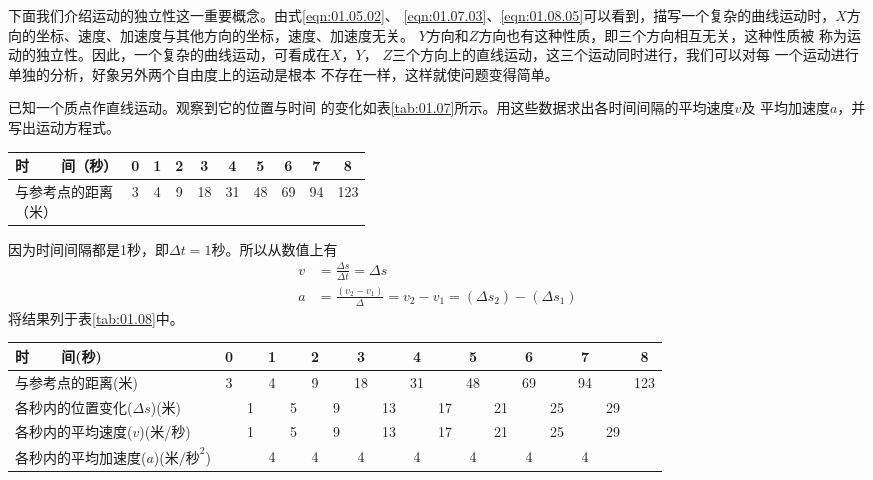 下面我们介绍运动的独立性这一重要概念。由式\eqref{eqn:01.05.02}、
\eqref{eqn:01.07.03}、\eqref{eqn:01.08.05}可以看到，描写一个复杂的曲线运动时，$X$方
向的坐标、速度、加速度与其他方向的坐标，速度、加速度无关。
$Y$方向和$Z$方向也有这种性质，即三个方向相互无关，这种性质被
称为运动的独立性。因此，一个复杂的曲线运动，可看成在$X$，$Y$，
$Z$三个方向上的直线运动，这三个运动同时进行，我们可以对每
一个运动进行单独的分析，好象另外两个自由度上的运动是根本
不存在一样，这样就使问题变得简单。

\example 已知一个质点作直线运动。观察到它的位置与时间
的变化如表\ref{tab:01.07}所示。用这些数据求出各时间间隔的平均速度$v$及
平均加速度$a$，并写出运动方程式。
\begin{tablex}[!h]{0.6em}
    \caption{}
    \label{tab:01.07}
    \centering
    \begin{tabular}{l|c|c|c|c|c|c|c|c|c}
        \toprule
        时~~~~间（秒） & 0 & 1 & 2 & 3 & 4 & 5 & 6 & 7 & 8 \\
        \midrule
        \makecell{与参考点的距离                           \\（米）}  &  3  &  4  &  9  &  18  &  31  &  48  &  69  &  94 & 123 \\
        \bottomrule
    \end{tabular}
\end{tablex}

\solution 因为时间间隔都是1秒，即$\Delta t=1$秒。所以从数值上有
\begin{align*}
    v & =\frac{\Delta s}{\Delta t}=\Delta s                         \\
    a & =\frac{(v_2-v_1)}{\Delta}=v_2-v_1=(\Delta s_2)-(\Delta s_1)
\end{align*}
将结果列于表\ref{tab:01.08}中。
\begin{tablex}[!h]{0.2mm}
        \caption{}
        \label{tab:01.08}
        \centering {}
        \begin{tabular}{l|c|c|c|c|c|c|c|c|c|c|c|c|c|c|c|c|c}
            \toprule
            时~~~~间(秒)                              & 0 &   & 1 &   & 2 &   & 3  &    & 4  &    & 5  &    & 6  &    & 7  &    & 8   \\
            \midrule
            与参考点的距离(米)                        & 3 &   & 4 &   & 9 &   & 18 &    & 31 &    & 48 &    & 69 &    & 94 &    & 123 \\
            各秒内的位置变化($\Delta s$)(米)          &   & 1 &   & 5 &   & 9 &    & 13 &    & 17 &    & 21 &    & 25 &    & 29 &     \\
            各秒内的平均速度($v$)(米/秒)              &   & 1 &   & 5 &   & 9 &    & 13 &    & 17 &    & 21 &    & 25 &    & 29 &     \\
            各秒内的平均加速度($a$)($\text{米/秒}^2$) &   &   & 4 &   & 4 &   & 4  &    & 4  &    & 4  &    & 4  &    & 4  &    &     \\
            \bottomrule
        \end{tabular}
\end{tablex}

